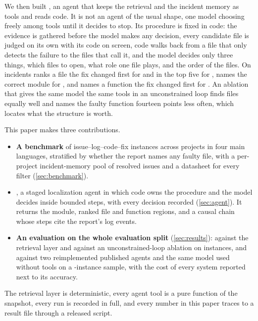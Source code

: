 We then built \sys{}, an agent that keeps the retrieval and the
incident memory as tools and reads code. It is not an agent of the
usual shape, one model choosing freely among tools until it decides to
stop. Its procedure is fixed in code: the evidence is gathered before
the model makes any decision, every candidate file is judged on its own with its
code on screen, code walks back from a file that only detects the
failure to the files that call it, and the model decides only three
things, which files to open, what role one file plays, and the order of
the files. On \nEval{} incidents \sys{} ranks a file the fix changed
first for \accOne{} and in the top five for \accFive{}, names the
correct module for \modOne{}, and names a function the fix changed
first for \regOne{}. An ablation that gives the same model the same
tools in an unconstrained loop finds files equally well and names the
faulty function fourteen points less often, which locates what the
structure is worth.

This paper makes three contributions.
\begin{itemize}
\item \textbf{A benchmark} of \nInstances{} issue--log--code--fix
  instances across \nProjects{} projects in four main languages, stratified
  by whether the report names any faulty file, with a per-project
  incident-memory pool of \nMemoryPool{} resolved issues and a datasheet
  for every filter (\cref{sec:benchmark}).
\item \textbf{\sys{}}, a staged localization agent in which code owns
  the procedure and the model decides inside bounded steps, with every
  decision recorded (\cref{sec:agent}). It returns the module, ranked
  file and function regions, and a causal chain whose steps cite the
  report's log events.
\item \textbf{An evaluation on the whole evaluation split}
  (\cref{sec:results}): \sys{} against the retrieval layer and against
  an unconstrained-loop ablation on \nEval{} instances, and against two
  reimplemented published agents and the same model used without tools
  on a \nSample-instance sample, with the cost of every system reported
  next to its accuracy.
\end{itemize}

The retrieval layer is deterministic, every agent tool is a pure
function of the snapshot, every run is recorded in full, and every
number in this paper traces to a result file through a released script.
